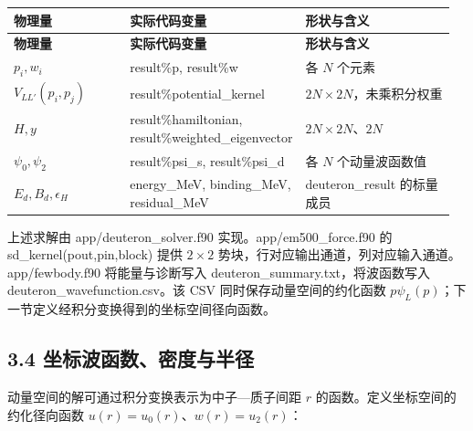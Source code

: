 \documentclass[UTF8,a4paper,zihao=5,fontset=fandol]{ctexart}
\begin{document}
{\small\setlength{\tabcolsep}{3pt}\renewcommand{\arraystretch}{1.28}
\begin{longtable}{@{}>{\raggedright\arraybackslash}p{0.2784\linewidth}>{\raggedright\arraybackslash}p{0.3264\linewidth}>{\raggedright\arraybackslash}p{0.3552\linewidth}@{}}\toprule
\textbf{物理量} & \textbf{实际代码变量} & \textbf{形状与含义}\\\midrule
\endfirsthead
\textbf{物理量} & \textbf{实际代码变量} & \textbf{形状与含义}\\\midrule
\endhead
\(p_i,w_i\) & {\ttfamily\small result\%p}, {\ttfamily\small result\%w} & 各 \(N\) 个元素\\
\(V_{LL'}(p_i,p_j)\) & {\ttfamily\small result\%potential\_\allowbreak{}kernel} & \(2N\times2N\)，未乘积分权重\\
\(H,y\) & {\ttfamily\small result\%hamiltonian}, {\ttfamily\small result\%weighted\_\allowbreak{}eigenvector} & \(2N\times2N\)、\(2N\)\\
\(\psi_0,\psi_2\) & {\ttfamily\small result\%psi\_\allowbreak{}s}, {\ttfamily\small result\%psi\_\allowbreak{}d} & 各 \(N\) 个动量波函数值\\
\(E_d,B_d,\epsilon_H\) & {\ttfamily\small energy\_\allowbreak{}MeV}, {\ttfamily\small binding\_\allowbreak{}MeV}, {\ttfamily\small residual\_\allowbreak{}MeV} & {\ttfamily\small deuteron\_\allowbreak{}result} 的标量成员\\
\bottomrule\end{longtable}}
上述求解由 {\ttfamily\small app/\allowbreak{}deuteron\_\allowbreak{}solver.\allowbreak{}f90} 实现。{\ttfamily\small app/\allowbreak{}em500\_\allowbreak{}force.\allowbreak{}f90} 的 {\ttfamily\small sd\_\allowbreak{}kernel(pout,pin,block)} 提供 \(2\times2\) 势块，行对应输出通道，列对应输入通道。{\ttfamily\small app/\allowbreak{}fewbody.\allowbreak{}f90} 将能量与诊断写入 {\ttfamily\small deuteron\_\allowbreak{}summary.\allowbreak{}txt}，将波函数写入 {\ttfamily\small deuteron\_\allowbreak{}wavefunction.\allowbreak{}csv}。该 CSV 同时保存动量空间的约化函数 \(p\psi_L(p)\)；下一节定义经积分变换得到的坐标空间径向函数。

\subsection*{3.4 坐标波函数、密度与半径}
动量空间的解可通过积分变换表示为中子—质子间距 \(r\) 的函数。定义坐标空间的约化径向函数 \(u(r)=u_0(r)\)、\(w(r)=u_2(r)\)：
\end{document}

